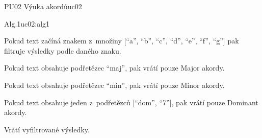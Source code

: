 \begin{usecase}{PU02 Výuka akordů}{uc02}
    \begin{scenario}{Alg.1}{uc02:alg1}
        \item Pokud text začíná znakem z~množiny [\enquote{a}, \enquote{b}, \enquote{c}, \enquote{d}, \enquote{e}, \enquote{f}, \enquote{g}] pak filtruje výsledky podle daného znaku.
        \item Pokud text obsahuje podřetězec \enquote{maj}, pak vrátí pouze Major akordy.
        \item Pokud text obsahuje podřetězec \enquote{min}, pak vrátí pouze Minor akordy.
        \item Pokud text obsahuje jeden z~podřetězců [\enquote{dom}, \enquote{7}], pak vrátí pouze Dominant akordy.
        \item Vrátí vyfiltrované výsledky.
    \end{scenario}
\end{usecase}